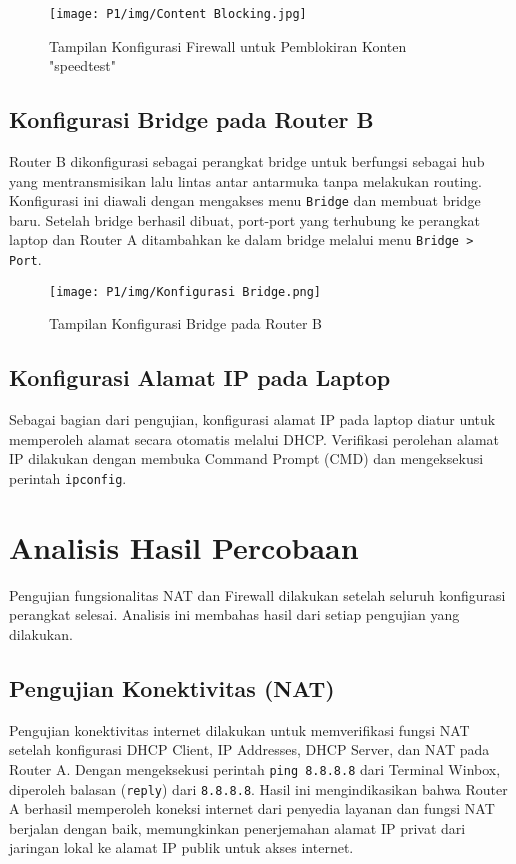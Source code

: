 \begin{figure}[H]
    \centering
    \texttt{[image: P1/img/Content Blocking.jpg]} %
    \caption{Tampilan Konfigurasi Firewall untuk Pemblokiran Konten "speedtest"}
    \label{fig:content_blocking_config}
\end{figure}

\subsection{Konfigurasi Bridge pada Router B}
Router B dikonfigurasi sebagai perangkat bridge untuk berfungsi sebagai hub yang mentransmisikan lalu lintas antar antarmuka tanpa melakukan routing. Konfigurasi ini diawali dengan mengakses menu \texttt{Bridge} dan membuat bridge baru. Setelah bridge berhasil dibuat, port-port yang terhubung ke perangkat laptop dan Router A ditambahkan ke dalam bridge melalui menu \texttt{Bridge > Port}.

\begin{figure}[H]
    \centering
    \texttt{[image: P1/img/Konfigurasi Bridge.png]} %
    \caption{Tampilan Konfigurasi Bridge pada Router B}
    \label{fig:bridge_config}
\end{figure}

\subsection{Konfigurasi Alamat IP pada Laptop}
Sebagai bagian dari pengujian, konfigurasi alamat IP pada laptop diatur untuk memperoleh alamat secara otomatis melalui DHCP. Verifikasi perolehan alamat IP dilakukan dengan membuka Command Prompt (CMD) dan mengeksekusi perintah \texttt{ipconfig}.

\section{Analisis Hasil Percobaan}

Pengujian fungsionalitas NAT dan Firewall dilakukan setelah seluruh konfigurasi perangkat selesai. Analisis ini membahas hasil dari setiap pengujian yang dilakukan.

\subsection{Pengujian Konektivitas (NAT)}
Pengujian konektivitas internet dilakukan untuk memverifikasi fungsi NAT setelah konfigurasi DHCP Client, IP Addresses, DHCP Server, dan NAT pada Router A. Dengan mengeksekusi perintah \texttt{ping 8.8.8.8} dari Terminal Winbox, diperoleh balasan (\texttt{reply}) dari \texttt{8.8.8.8}. Hasil ini mengindikasikan bahwa Router A berhasil memperoleh koneksi internet dari penyedia layanan dan fungsi NAT berjalan dengan baik, memungkinkan penerjemahan alamat IP privat dari jaringan lokal ke alamat IP publik untuk akses internet.

